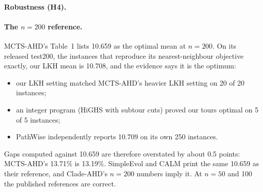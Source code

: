 \paragraph{Robustness (H4).} \HfourSentence

\paragraph{The $n=200$ reference.} MCTS-AHD's Table~1 lists 10.659 as the optimal mean at $n=200$.
On its released test200, the instances that reproduce its nearest-neighbour objective exactly, our LKH mean is 10.708, and the evidence says it is the optimum:
\begin{itemize}
\item our LKH setting matched MCTS-AHD's heavier LKH setting on 20 of 20 instances;
\item an integer program (HiGHS with subtour cuts) proved our tours optimal on 5 of 5 instances;
\item PathWise independently reports 10.709 on its own 250 instances.
\end{itemize}
Gaps computed against 10.659 are therefore overstated by about 0.5 points: MCTS-AHD's 13.71\% is
13.19\%. SimpleEvol and CALM print the same 10.659 as their reference, and Clade-AHD's $n=200$ numbers imply it. At $n=50$ and 100 the published
references are correct.
